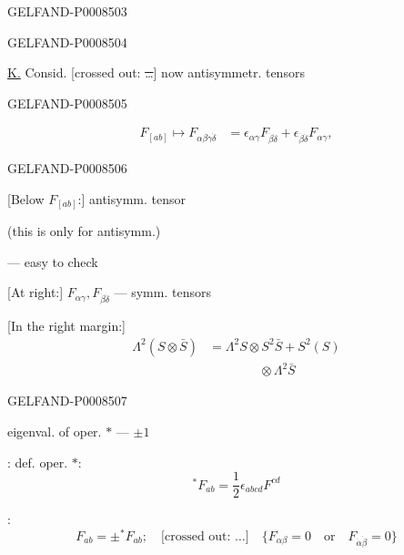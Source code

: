 \begin{GelfandAdjacentEvidence}{GELFAND-P000850}{3}

\end{GelfandAdjacentEvidence}
\begin{GelfandAdjacentEvidence}{GELFAND-P000850}{4}


\uline{K.} Consid. [crossed out: \sout{…}] now antisymmetr. tensors
\end{GelfandAdjacentEvidence}
\begin{GelfandAdjacentEvidence}{GELFAND-P000850}{5}

\[
\begin{aligned}
F_{[ab]}\longmapsto F_{\alpha\beta\dot\gamma\dot\delta}
&=\epsilon_{\alpha\gamma}F_{\dot\beta\dot\delta}
+\epsilon_{\dot\beta\dot\delta}F_{\alpha\gamma},
\end{aligned} \tag{10}
\]
\end{GelfandAdjacentEvidence}
\begin{GelfandAdjacentEvidence}{GELFAND-P000850}{6}


[Below \(F_{[ab]}\):] antisymm. tensor

(this is only for antisymm.)

— easy to check

[At right:] \(F_{\alpha\gamma},F_{\dot\beta\dot\delta}\) — symm. tensors

[In the right margin:]
\[
\begin{aligned}
\Lambda^2(S\otimes\bar S)&=\Lambda^2S\otimes S^2\bar S+S^2(S)\\
 &\qquad\qquad\otimes\Lambda^2\bar S
\end{aligned} \tag{*}
\]
\end{GelfandAdjacentEvidence}
\begin{GelfandAdjacentEvidence}{GELFAND-P000850}{7}

eigenval. of oper. \(*\) — \(\pm1\)

: def. oper. \(*\):
\[
{}^*F_{ab}=\frac12\epsilon_{abcd}F^{cd} \tag{11}
\]

:
\[
F_{ab}=\pm{}^*F_{ab};\quad
\text{[crossed out: …]}\quad
\{F_{\alpha\beta}=0\quad\text{or}\quad F_{\dot\alpha\dot\beta}=0\} \tag{12}
\]
\end{GelfandAdjacentEvidence}
